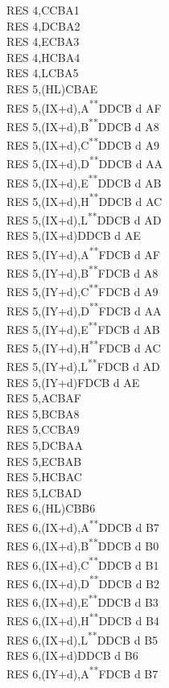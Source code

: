 \documentclass[12pt,twoside,openright,a4paper]{book}
\newcommand{\UNDOC}{\textnormal{\textsuperscript{**}}}
\begin{document}
\begin{multicols}{3}
{\begin{tabbing}
	RES 4,C\>CBA1\\
	RES 4,D\>CBA2\\
	RES 4,E\>CBA3\\
	RES 4,H\>CBA4\\
	RES 4,L\>CBA5\\
	RES 5,(HL)\>CBAE\\
	RES 5,(IX+d),A\UNDOC\>DDCB d AF\\
	RES 5,(IX+d),B\UNDOC\>DDCB d A8\\
	RES 5,(IX+d),C\UNDOC\>DDCB d A9\\
	RES 5,(IX+d),D\UNDOC\>DDCB d AA\\
	RES 5,(IX+d),E\UNDOC\>DDCB d AB\\
	RES 5,(IX+d),H\UNDOC\>DDCB d AC\\
	RES 5,(IX+d),L\UNDOC\>DDCB d AD\\
	RES 5,(IX+d)\>DDCB d AE\\
	RES 5,(IY+d),A\UNDOC\>FDCB d AF\\
	RES 5,(IY+d),B\UNDOC\>FDCB d A8\\
	RES 5,(IY+d),C\UNDOC\>FDCB d A9\\
	RES 5,(IY+d),D\UNDOC\>FDCB d AA\\
	RES 5,(IY+d),E\UNDOC\>FDCB d AB\\
	RES 5,(IY+d),H\UNDOC\>FDCB d AC\\
	RES 5,(IY+d),L\UNDOC\>FDCB d AD\\
	RES 5,(IY+d)\>FDCB d AE\\
	RES 5,A\>CBAF\\
	RES 5,B\>CBA8\\
	RES 5,C\>CBA9\\
	RES 5,D\>CBAA\\
	RES 5,E\>CBAB\\
	RES 5,H\>CBAC\\
	RES 5,L\>CBAD\\
	RES 6,(HL)\>CBB6\\
	RES 6,(IX+d),A\UNDOC\>DDCB d B7\\
	RES 6,(IX+d),B\UNDOC\>DDCB d B0\\
	RES 6,(IX+d),C\UNDOC\>DDCB d B1\\
	RES 6,(IX+d),D\UNDOC\>DDCB d B2\\
	RES 6,(IX+d),E\UNDOC\>DDCB d B3\\
	RES 6,(IX+d),H\UNDOC\>DDCB d B4\\
	RES 6,(IX+d),L\UNDOC\>DDCB d B5\\
	RES 6,(IX+d)\>DDCB d B6\\
	RES 6,(IY+d),A\UNDOC\>FDCB d B7\\

\end{tabbing}}
\end{multicols}
\end{document}
